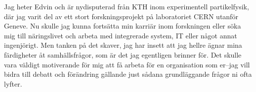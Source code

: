 \documentclass[11pt, a4paper]{../awesome-cv} %
\begin{document}
\makecvheader %

\makelettertitle %


\begin{cvletter}
\vspace{.6cm}

Jag heter Edvin och är nydisputerad från KTH inom experimentell partikelfysik, där jag varit del av ett stort forskningsprojekt på laboratoriet CERN utanför Geneve.
Nu skulle jag kunna fortsätta min karriär inom forskningen eller söka mig till näringslivet och arbeta med integrerade system, IT eller något annat ingenjörigt.
Men tanken på det skaver, jag har insett att jag hellre ägnar mina färdigheter åt samhällsfrågor, som är det jag egentligen brinner för. %
Det skulle vara väldigt motiverande för mig att få arbeta för en organisation som er–jag vill bidra till debatt och förändring gällande just sådana grundläggande frågor ni ofta lyfter.


\end{cvletter}
\end{document}
